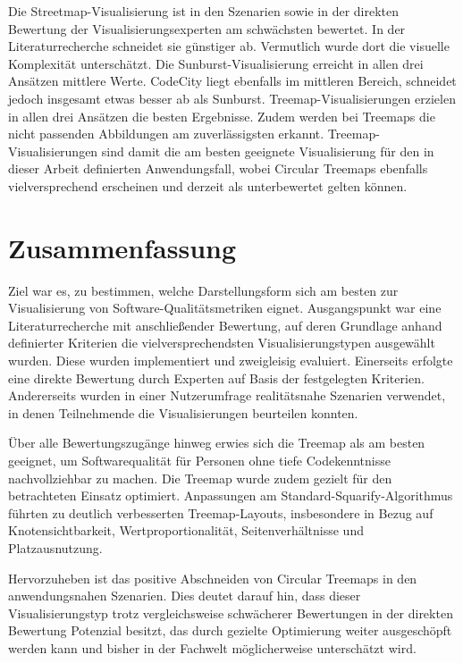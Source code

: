 Die Streetmap-Visualisierung ist in den Szenarien sowie in der direkten Bewertung der Visualisierungsexperten am schwächsten bewertet. In der Literaturrecherche schneidet sie günstiger ab. Vermutlich wurde dort die visuelle Komplexität unterschätzt. Die Sunburst-Visualisierung erreicht in allen drei Ansätzen mittlere Werte. CodeCity liegt ebenfalls im mittleren Bereich, schneidet jedoch insgesamt etwas besser ab als Sunburst. Treemap-Visualisierungen erzielen in allen drei Ansätzen die besten Ergebnisse. Zudem werden bei Treemaps die nicht passenden Abbildungen am zuverlässigsten erkannt. Treemap-Visualisierungen sind damit die am besten geeignete Visualisierung für den in dieser Arbeit definierten Anwendungsfall, wobei Circular Treemaps ebenfalls vielversprechend erscheinen und derzeit als unterbewertet gelten können.

\section{Zusammenfassung} \label{sec:Zusammenfassung}

Ziel war es, zu bestimmen, welche Darstellungsform sich am besten zur Visualisierung von Software-Qualitätsmetriken eignet. Ausgangspunkt war eine Literaturrecherche mit anschließender Bewertung, auf deren Grundlage anhand definierter Kriterien die vielversprechendsten Visualisierungstypen ausgewählt wurden. Diese wurden implementiert und zweigleisig evaluiert. Einerseits erfolgte eine direkte Bewertung durch Experten auf Basis der festgelegten Kriterien. Andererseits wurden in einer Nutzerumfrage realitätsnahe Szenarien verwendet, in denen Teilnehmende die Visualisierungen beurteilen konnten.

Über alle Bewertungszugänge hinweg erwies sich die Treemap als am besten geeignet, um Softwarequalität für Personen ohne tiefe Codekenntnisse nachvollziehbar zu machen. Die Treemap wurde zudem gezielt für den betrachteten Einsatz optimiert. Anpassungen am Standard-Squarify-Algorithmus führten zu deutlich verbesserten Treemap-Layouts, insbesondere in Bezug auf Knotensichtbarkeit, Wertproportionalität, Seitenverhältnisse und Platzausnutzung.

Hervorzuheben ist das positive Abschneiden von Circular Treemaps in den anwendungsnahen Szenarien. Dies deutet darauf hin, dass dieser Visualisierungstyp trotz vergleichsweise schwächerer Bewertungen in der direkten Bewertung Potenzial besitzt, das durch gezielte Optimierung weiter ausgeschöpft werden kann und bisher in der Fachwelt möglicherweise unterschätzt wird.

